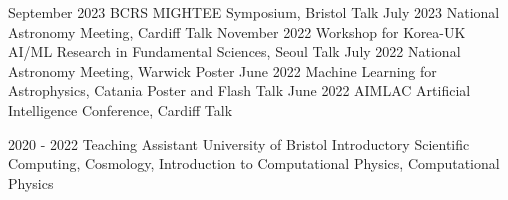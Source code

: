 \documentclass[9pt]{developercv} %
\begin{document}
\vspace{-10 pt}
\begin{entrylist}
    \vspace{-10 pt}
    \entry
		{September 2023}
		{BCRS MIGHTEE Symposium, \textnormal{Bristol}}
		{Talk}
        {}
    \vspace{-10 pt}
    \entry
		{July 2023}
		{National Astronomy Meeting, \textnormal{Cardiff}}
		{Talk}
        {}
    \vspace{-10 pt}
    \entry
		{November 2022}
		{Workshop for Korea-UK AI/ML Research in Fundamental Sciences, \textnormal{Seoul}}
		{Talk}
        {}
    \vspace{-10 pt}
    \entry
		{July 2022}
		{National Astronomy Meeting, \textnormal{Warwick}}
		{Poster}
        {}
    \vspace{-10 pt}
	\entry
		{June 2022}
		{Machine Learning for Astrophysics, \textnormal{Catania}}
		{Poster and Flash Talk}
        {}
    \vspace{-10 pt}
    \entry
		{June 2022}
		{AIMLAC Artificial Intelligence Conference, \textnormal{Cardiff}}
		{Talk}
        {}
\end{entrylist}


\vspace{-10pt}
\begin{entrylist}
    \entry
            {2020 - 2022}
            {Teaching Assistant}
            {University of Bristol}
            {Introductory Scientific Computing, Cosmology, Introduction to Computational Physics, Computational Physics}
\end{entrylist}
\end{document}
